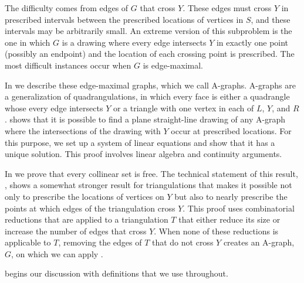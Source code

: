 

The difficulty comes from edges of $G$ that cross $Y$.
These edges must cross $Y$ in prescribed
intervals between the prescribed locations of vertices in $S$, and
these intervals may be arbitrarily small.  An extreme version of this
subproblem is the one in which $G$ is a drawing where every
edge intersects $Y$ in exactly one point (possibly an endpoint) and
the location of each crossing point is prescribed.  The most difficult
instances occur when $G$ is edge-maximal.

In  we describe these edge-maximal graphs, which
we call A-graphs.  A-graphs are a generalization of quadrangulations, in
which every face is either a quadrangle whose every edge intersects $Y$ or a triangle with one vertex in
each of $L$, $Y$, and $R$.   %
shows that it
is possible to find a plane straight-line drawing of any A-graph where
the intersections of the drawing with $Y$ occur at prescribed locations.
For this purpose, we set up a system of linear equations and show that
it has a unique solution. This proof involves linear algebra and
 continuity arguments.

In  we prove that every collinear set is free.
The technical statement of this result, , shows a somewhat
stronger result for triangulations that makes it possible not only to
prescribe the locations of vertices on $Y$ but also to nearly prescribe the
points at which edges of the triangulation cross $Y$.  This proof uses combinatorial
reductions that are applied to a triangulation $T$ that either reduce its
size or increase the number of edges that cross $Y$.  When none of these
reductions is applicable to $T$, removing the edges of $T$ that do not
cross $Y$ creates an A-graph, $G$, on which we can apply .

 begins our discussion with definitions %
 that we use throughout.

